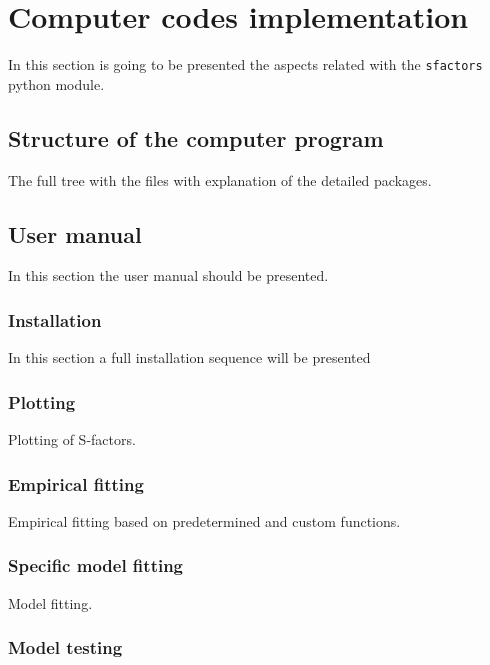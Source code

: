 \documentclass[openany]{book}
\begin{document}
\chapter{Computer codes implementation} \label{ap:codes}

In this section is going to be presented the aspects related with the \texttt{sfactors} python module. 

\section{Structure of the computer program} \label{sec:programStructure}

The full tree with the files with explanation of the detailed packages.

\section{User manual} \label{sec:userManual}

In this section the user manual should be presented.

\subsection{Installation} \label{sub:codesInstallation}

In this section a full installation sequence will be presented

\subsection{Plotting}  \label{sub:codesPlotting}

Plotting of S-factors. 

\subsection{Empirical fitting} \label{sub:codesEmpiricalFitting}

Empirical fitting based on predetermined and custom functions.

\subsection{Specific model fitting}  \label{sub:codesModelFitting}

Model fitting.

\subsection{Model testing} \label{sub:codesModelTesting}
\end{document}
